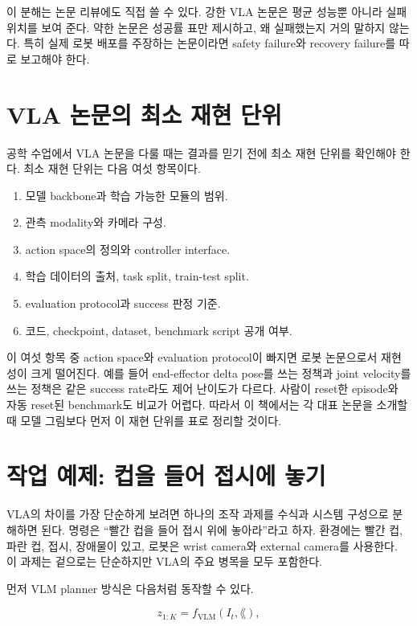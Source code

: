 이 분해는 논문 리뷰에도 직접 쓸 수 있다. 강한 VLA 논문은 평균 성능뿐 아니라 실패 위치를 보여 준다. 약한 논문은 성공률 표만 제시하고, 왜 실패했는지 거의 말하지 않는다. 특히 실제 로봇 배포를 주장하는 논문이라면 safety failure와 recovery failure를 따로 보고해야 한다.

\section{VLA 논문의 최소 재현 단위}

공학 수업에서 VLA 논문을 다룰 때는 결과를 믿기 전에 최소 재현 단위를 확인해야 한다. 최소 재현 단위는 다음 여섯 항목이다.

\begin{enumerate}
  \item 모델 backbone과 학습 가능한 모듈의 범위.
  \item 관측 modality와 카메라 구성.
  \item action space의 정의와 controller interface.
  \item 학습 데이터의 출처, task split, train-test split.
  \item evaluation protocol과 success 판정 기준.
  \item 코드, checkpoint, dataset, benchmark script 공개 여부.
\end{enumerate}

이 여섯 항목 중 action space와 evaluation protocol이 빠지면 로봇 논문으로서 재현성이 크게 떨어진다. 예를 들어 end-effector delta pose를 쓰는 정책과 joint velocity를 쓰는 정책은 같은 success rate라도 제어 난이도가 다르다. 사람이 reset한 episode와 자동 reset된 benchmark도 비교가 어렵다. 따라서 이 책에서는 각 대표 논문을 소개할 때 모델 그림보다 먼저 이 재현 단위를 표로 정리할 것이다.

\section{작업 예제: 컵을 들어 접시에 놓기}

VLA의 차이를 가장 단순하게 보려면 하나의 조작 과제를 수식과 시스템 구성으로 분해하면 된다. 명령은 ``빨간 컵을 들어 접시 위에 놓아라''라고 하자. 환경에는 빨간 컵, 파란 컵, 접시, 장애물이 있고, 로봇은 wrist camera와 external camera를 사용한다. 이 과제는 겉으로는 단순하지만 VLA의 주요 병목을 모두 포함한다.

먼저 VLM planner 방식은 다음처럼 동작할 수 있다.

\begin{equation}
  z_{1:K}
  =
  f_{\mathrm{VLM}}(I_t, \lang),
\end{equation}

